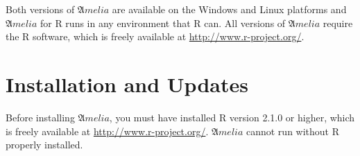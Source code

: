 \documentclass[12pt,titlepage]{article}
\newcommand{\Amelia}{\ensuremath{\mathfrak Amelia} }
\begin{document}
Both versions of \Amelia are available on the Windows and Linux
platforms and \Amelia for R runs in any environment that R can.  All
versions of ${\mathfrak Amelia}$ require the R software, which is
freely available at \url{http://www.r-project.org/}.


\section{Installation and Updates}
\label{sec:install}

Before installing ${\mathfrak Amelia}$, you must have installed R
version 2.1.0 or higher, which is freely available at
\url{http://www.r-project.org/}.  ${\mathfrak Amelia}$ cannot run
without R properly installed.
\end{document}
